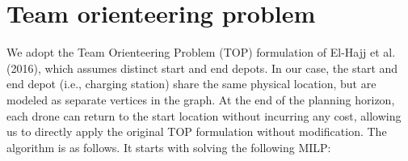 \documentclass{article}
\newcommand{\set}[1]{\mathcal{#1}}
\begin{document}

\iffalse
\section{Team orienteering problem}
We adopt the Team Orienteering Problem (TOP) formulation of El-Hajj et al. (2016), which assumes distinct start and end depots. In our case, the start and end depot (i.e., charging station) share the same physical location, but are modeled as separate vertices in the graph. At the end of the planning horizon, each drone can return to the start location without incurring any cost, allowing us to directly apply the original TOP formulation without modification. The algorithm is as follows. It starts with solving the following MILP:
\end{document}
